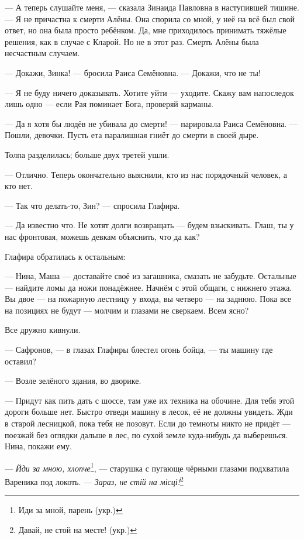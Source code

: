 --- А теперь слушайте меня, --- сказала Зинаида Павловна в наступившей тишине.
--- Я не причастна к смерти Алёны.
Она спорила со мной, у неё на всё был свой ответ, но она была просто ребёнком.
Да, мне приходилось принимать тяжёлые решения, как в случае с Кларой.
Но не в этот раз.
Смерть Алёны была несчастным случаем.

--- Докажи, Зинка! --- бросила Раиса Семёновна.
--- Докажи, что не ты!

--- Я не буду ничего доказывать.
Хотите уйти --- уходите.
Скажу вам напоследок лишь одно --- если Рая поминает Бога, проверяй карманы.

--- Да я хотя бы людёв не убивала до смерти! --- парировала Раиса Семёновна.
--- Пошли, девочки.
Пусть ета паралишная гниёт до смерти в своей дыре.

Толпа разделилась;
больше двух третей ушли.

--- Отлично.
Теперь окончательно выяснили, кто из нас порядочный человек, а кто нет.

--- Так что делать-то, Зин? --- спросила Глафира.

--- Да известно что.
Не хотят долги возвращать --- будем взыскивать.
Глаш, ты у нас фронтовая, можешь девкам объяснить, что да как?

Глафира обратилась к остальным:

--- Нина, Маша --- доставайте своё из загашника, смазать не забудьте.
Остальные --- найдите ломы да ножи понадёжнее.
Начнём с этой общаги, с нижнего этажа.
Вы двое --- на пожарную лестницу у входа, вы четверо --- на заднюю.
Пока все на позициях не будут --- молчим и глазами не сверкаем.
Всем ясно?

Все дружно кивнули.

--- Сафронов, --- в глазах Глафиры блестел огонь бойца, --- ты машину где оставил?

--- Возле зелёного здания, во дворике.

--- Придут как пить дать с шоссе, там уже их техника на обочине.
Для тебя этой дороги больше нет.
Быстро отведи машину в лесок, её не должны увидеть.
Жди в старой лесницкой, пока тебя не позовут.
Если до темноты никто не придёт --- поезжай без оглядки дальше в лес, по сухой земле куда-нибудь да выберешься.
Нина, покажи ему.

--- \textit{Йди за мною, хлопче}\footnote{Иди за мной, парень (укр.)}, --- старушка с пугающе чёрными глазами подхватила Вареника под локоть.
--- \textit{Зараз, не стій на місці!}\footnote{Давай, не стой на месте! (укр.)}

